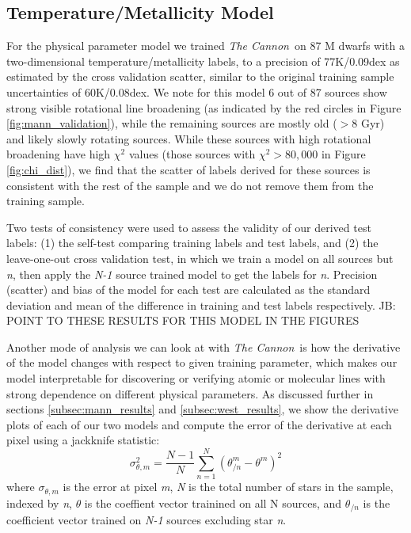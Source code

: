 \documentclass[modern]{aastex62}
\newcommand{\thecannon}{\textsl{The Cannon}}
\begin{document}
\subsection{Temperature/Metallicity Model \label{subsec:mann_results}}
For the physical parameter model we trained \thecannon\ on 87 M dwarfs with a two-dimensional temperature/metallicity labels, to a precision of 77K/0.09dex as estimated by the cross validation scatter, similar to the original training sample uncertainties of 60K/0.08dex. We note for this model 6 out of 87 sources show strong visible rotational line broadening (as indicated by the red circles in Figure \ref{fig:mann_validation}), while the remaining sources are mostly old ($>8$ Gyr) and likely slowly rotating sources. While these sources with high rotational broadening have high $\chi^2$ values (those sources with $\chi^2 > 80,000$ in Figure \ref{fig:chi_dist}), we find that the scatter of labels derived for these sources is consistent with the rest of the sample and we do not remove them from the training sample.

Two tests of consistency were used to assess the validity of our derived test labels: (1) the self-test comparing training labels and test labels, and (2) the leave-one-out cross validation test, in which we train a model on all sources but \emph{n}, then apply the \emph{N-1} source trained model to get the labels for \emph{n}. Precision (scatter) and bias of the model for each test are calculated as the standard deviation and mean of the difference in training and test labels respectively. JB: POINT TO THESE RESULTS FOR THIS MODEL IN THE FIGURES

Another mode of analysis we can look at with \thecannon\ is how the derivative of the model changes with respect to given training parameter, which makes our model interpretable for discovering or verifying atomic or molecular lines with strong dependence on different physical parameters. As discussed further in sections \ref{subsec:mann_results} and \ref{subsec:west_results}, we show the derivative plots of each of our two models and compute the error of the derivative at each pixel using a jackknife statistic:
\begin{equation}
	\sigma_{\theta,m}^2 = \frac{N-1}{N} \sum^N_{n=1} (\theta_{/n}^m - \theta^m)^2 
\end{equation}
where $\sigma_{\theta,m}$ is the error at pixel \emph{m}, \emph{N} is the total number of stars in the sample, indexed by \emph{n}, $\theta$ is the coeffient vector trainined on all N sources, and $\theta_{/n}$ is the coefficient vector trained on \emph{N-1} sources excluding star \emph{n}.
\end{document}
